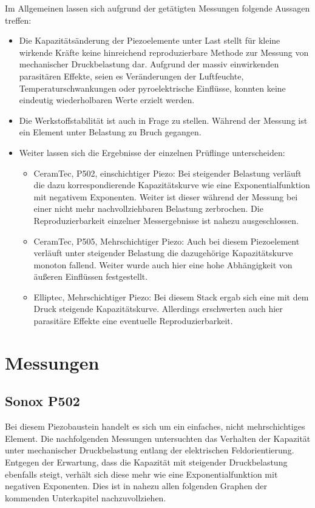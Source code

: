 \documentclass[12pt]{scrreprt} %
\begin{document}
Im Allgemeinen lassen sich aufgrund der getätigten Messungen folgende Aussagen treffen:
\begin{itemize}
\item
Die Kapazitätsänderung der Piezoelemente unter Last stellt für kleine wirkende Kräfte keine hinreichend reproduzierbare Methode zur Messung von mechanischer Druckbelastung dar. Aufgrund der massiv einwirkenden parasitären Effekte, seien es Veränderungen der Luftfeuchte, Temperaturschwankungen oder pyroelektrische Einflüsse, konnten keine eindeutig wiederholbaren Werte erzielt werden.
\item
Die Werkstoffstabilität ist auch in Frage zu stellen. Während der Messung ist ein Element unter Belastung zu Bruch gegangen.
\item
Weiter lassen sich die Ergebnisse der einzelnen Prüflinge unterscheiden:
\begin{itemize}
\item
CeramTec, P502, einschichtiger Piezo: Bei steigender Belastung verläuft die dazu korrespondierende Kapazitätskurve wie eine Exponentialfunktion mit negativem Exponenten. Weiter ist dieser während der Messung bei einer nicht mehr nachvollziehbaren Belastung zerbrochen. Die Reproduzierbarkeit einzelner Messergebnisse ist nahezu ausgeschlossen.
\item
CeramTec, P505, Mehrschichtiger Piezo: Auch bei diesem Piezoelement verläuft unter steigender Belastung die dazugehörige Kapazitätskurve monoton fallend. Weiter wurde auch hier eine hohe Abhängigkeit von äußeren Einflüssen festgestellt.
\item
Elliptec, Mehrschichtiger Piezo: Bei diesem Stack ergab sich eine mit dem Druck steigende Kapazitätskurve. Allerdings erschwerten auch hier parasitäre Effekte eine eventuelle Reproduzierbarkeit.
\end{itemize}
\end{itemize}


\section{Messungen}

\subsection{Sonox P502} 
Bei diesem Piezobaustein handelt es sich um ein einfaches, nicht mehrschichtiges Element. Die nachfolgenden Messungen untersuchten das Verhalten der Kapazität unter mechanischer Druckbelastung entlang der elektrischen Feldorientierung. Entgegen der Erwartung, dass die Kapazität mit steigender Druckbelastung ebenfalls steigt, verhält sich diese mehr wie eine Exponentialfunktion mit negativen Exponenten. Dies ist in nahezu allen folgenden Graphen der kommenden Unterkapitel nachzuvollziehen.
\end{document}
